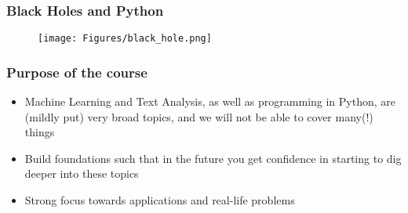 \documentclass[compress, aspectratio=54]{beamer}
\begin{document}
\begin{frame}
\frametitle{Black Holes and Python}
\begin{figure}
\texttt{[image: Figures/black\_hole.png]}
\end{figure}
\end{frame}

\begin{frame}
\frametitle{Purpose of the course}
\begin{itemize}

\item Machine Learning and  Text Analysis, as well as programming in Python, are (mildly put) very broad topics, and we will not be able to cover many(!) things
\item Build foundations such that in the future you get confidence in starting to dig deeper into these topics
 \item Strong focus towards applications and real-life problems
\end{itemize}
\end{frame}
\end{document}
